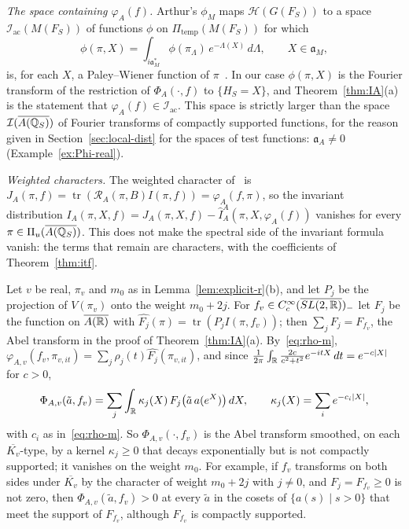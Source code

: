 \emph{The space containing $\varphi_A(f)$.} Arthur's
$\phi_M$ maps $\mathcal H(G(F_S))$ to a space $\mathcal I_{\mathrm{ac}}
(M(F_S))$ of functions $\phi$ on $\Pi_{\mathrm{temp}}(M(F_S))$ for which
\[
\phi(\pi,X)=\int_{i\mathfrak a_M^*}\phi(\pi_\Lambda)\,e^{-\Lambda(X)}\,
d\Lambda,\qquad X\in\mathfrak a_M,
\]
is, for each $X$, a Paley--Wiener function of $\pi$~\cite[\S11]{Ar89}.
In our
case $\phi(\pi,X)$ is the Fourier transform of the restriction of
$\Phi_A(\cdot,f)$ to $\{H_S=X\}$, and Theorem~\ref{thm:IA}(a) is the
statement that $\varphi_A(f)\in\mathcal I_{\mathrm{ac}}$. This space is
strictly larger than the space $\mathcal I(\overline{A(\mathbb{Q}_S)})$ of Fourier
transforms of compactly supported functions, for the reason given in
Section~\ref{sec:local-dist} for the spaces of test functions:
$\mathfrak a_A\ne0$ (Example~\ref{ex:Phi-real}).

\emph{Weighted characters.} The weighted character of~\cite{Ar88b} is
$J_A(\pi,f)=\operatorname{tr}(\mathcal R_A(\pi,B)I(\pi,f))=\varphi_A(f,
\pi)$, so the invariant distribution $I_A(\pi,X,f)=J_A(\pi,X,f)-
\hat I^A_A(\pi,X,\varphi_A(f))$ vanishes for every $\pi\in\Pi_u(\overline{A(\mathbb{Q}_S)})$.
This does not
make the spectral side of the invariant formula vanish: the terms that
remain are characters, with the coefficients of Theorem~\ref{thm:itf}.

\begin{example}\label{ex:Phi-real}
Let $v$ be real, $\pi_v$ and $m_0$ as in Lemma~\ref{lem:explicit-r}(b),
and let $P_j$ be the projection of $V(\pi_v)$ onto the weight $m_0+2j$.
For $f_v\in C_c^\infty(\overline{SL(2,\mathbb{R})})_-$ let $F_j$ be the function
on $\overline{A(\mathbb{R})}$ with $\widehat{F_j}(\pi)=\operatorname{tr}(P_jI(\pi,
f_v))$; then $\sum_jF_j=F_{f_v}$, the Abel transform in the proof of
Theorem~\ref{thm:IA}(a). By~\eqref{eq:rho-m}, $\varphi_{A,v}(f_v,\pi_{v,it})
=\sum_j\rho_j(t)\widehat{F_j}(\pi_{v,it})$, and since
$\frac1{2\pi}\int_{\mathbb{R}}\frac{2c}{c^2+t^2}e^{-itX}\,dt=e^{-c|X|}$ for $c>0$,
\[
\Phi_{A,v}(\tilde a,f_v)=\sum_j\int_{\mathbb{R}}\kappa_j(X)\,F_j\bigl(\tilde a\,a(e^X)
\bigr)\,dX,\qquad\kappa_j(X)=\sum_ie^{-c_i|X|},
\]
with $c_i$ as in~\eqref{eq:rho-m}. So $\Phi_{A,v}(\cdot,f_v)$ is the Abel
transform smoothed, on each $\overline{K_v}$-type, by a kernel
$\kappa_j\ge0$ that decays exponentially but is not compactly supported;
it vanishes on the weight $m_0$. For example, if $f_v$ transforms on
both sides under $\overline{K_v}$ by the character of weight $m_0+2j$
with $j\ne0$, and $F_j=F_{f_v}\ge0$ is not zero, then $\Phi_{A,v}(\tilde
a,f_v)>0$ at every $\tilde a$ in the cosets of $\{a(s)\mid s>0\}$ that
meet the support of $F_{f_v}$, although $F_{f_v}$ is compactly supported.
\end{example}

